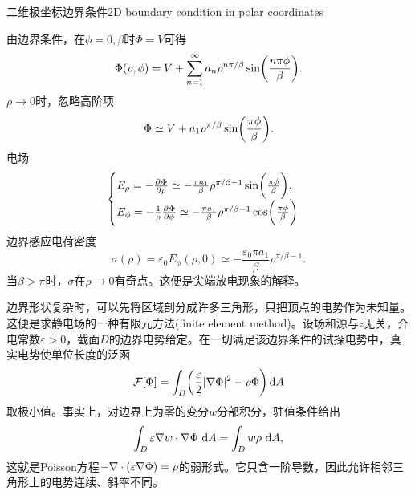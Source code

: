 \begin{example}{二维极坐标边界条件}{2D boundary condition in polar coordinates}
    \begin{notecaptionblock}
        \label{fig:2D angular boundary}
    \end{notecaptionblock}
    由边界条件，在$\phi = 0,\beta$时$\Phi = V$可得
    \begin{equation}
        \Phi(\rho,\phi) = V + \sum_{n=1}^\infty a_n\rho^{n\pi/\beta}\sin\biggl(\frac{n\pi\phi}\beta\biggr).
    \end{equation}
    $\rho \to 0$时，忽略高阶项
    \[
        \Phi \simeq V + a_1\rho^{\pi/\beta}\sin\biggl(\frac{\pi\phi}\beta\biggr).
    \]
    电场 
    \begin{equation}
        \begin{cases}
            E_\rho = -\frac{\partial^{}\Phi}{\partial{\rho}^{}} \simeq -\frac{\pi a_1}\beta\rho^{\pi/\beta-1}\sin\biggl(\frac{\pi\phi}\beta\biggr).\\
            E_\phi = -\frac1\rho\frac{\partial^{}\Phi}{\partial{\phi}^{}} \simeq -\frac{\pi a_1}\beta\rho^{\pi/\beta-1}\cos\biggl(\frac{\pi\phi}\beta\biggr)
        \end{cases}
    \end{equation}
    边界感应电荷密度
    \begin{equation}
        \sigma(\rho) = \varepsilon_0E_\phi(\rho,0) \simeq -\frac{\varepsilon_0\pi a_1}\beta\rho^{\pi/\beta-1}.
    \end{equation}
    当$\beta > \pi$时，$\sigma$在$\rho \to 0$有奇点。这便是尖端放电现象的解释。
\end{example}

\label{sec:finite element analysis}

边界形状复杂时，可以先将区域剖分成许多三角形，只把顶点的电势作为未知量。这便是求静电场的一种有限元方法(finite element method)。设场和源与$z$无关，介电常数$\varepsilon > 0$，截面$D$的边界电势给定。在一切满足该边界条件的试探电势中，真实电势使单位长度的泛函
\begin{equation}
    \label{eq:ed-electrostatic-fem-functional}
    \mathcal F[\Phi] = \int_D\biggl(\frac{\varepsilon}{2}\lvert\nabla\Phi\rvert^2 - \rho\Phi\biggr)\mathop{}\!\mathrm{d} A
\end{equation}
取极小值。事实上，对边界上为零的变分$w$分部积分，驻值条件给出
\begin{equation}
    \label{eq:ed-electrostatic-fem-weak-form}
    \int_D\varepsilon\nabla w \cdot \nabla\Phi\,\mathop{}\!\mathrm{d} A = \int_D w\rho\,\mathop{}\!\mathrm{d} A,
\end{equation}
这就是Poisson方程$-\nabla\cdot(\varepsilon\nabla\Phi) = \rho$的弱形式。它只含一阶导数，因此允许相邻三角形上的电势连续、斜率不同。

